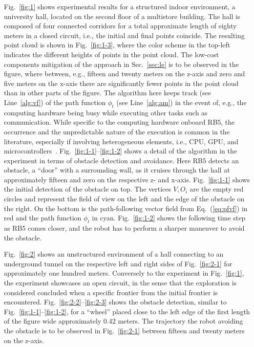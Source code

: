 \documentclass[lettersize,journal,twoside]{IEEEtran}
\theoremstyle{definition}
\begin{document}
Fig.~\ref{fig:1} shows experimental results for a structured indoor environment, a university hall, located on the second floor of a multistore building. The hall is composed of four connected corridors for a total approximate length of eighty meters in a closed circuit, i.e., the initial and final points coincide. The resulting point cloud is shown in Fig.~\ref{fig:1-3}, where the color scheme in the top-left indicates the different heights of points in the point cloud. The low-cost components mitigation of the %
approach in Sec.~\ref{sec:le} is to be observed in the figure, where between, e.g., fifteen and twenty meters on the z-axis and zero and five meters on the x-axis there are significantly fewer points in the point cloud than in other parts of the figure. The algorithm here keeps track (see Line~\ref{alg:vf}) of the path function $\phi_t$ (see Line~\ref{alg:am}) in the event of, e.g., the computing hardware being busy while executing other tasks such as communication. While specific to the computing hardware onboard RB5, the occurrence and the unpredictable nature of the execution is common in the literature, especially if involving heterogeneous elements, i.e., CPU, GPU, and microcontrollers~\cite{seewald2019coarse}.
%
Fig.~\ref{fig:1-1}--\ref{fig:1-2} shows a detail of the algorithm in the experiment in terms of obstacle detection and avoidance. Here RB5 detects an obstacle, a ``door'' with a surrounding wall, as it cruises through the hall at approximately fifteen and zero on the respective z- and x-axis. Fig.~\ref{fig:1-1} shows the initial detection of the obstacle on top. The vertices $V, O_i$ are the empty red circles and represent the field of view on the left and the edge of the obstacle on the right. On the bottom is the path-following vector field from Eq.~(\ref{eq:pfvf}) in red and the path function $\phi_t$ in cyan. Fig.~\ref{fig:1-2} shows the following time step as RB5 comes closer, and the robot has to perform a sharper maneuver to avoid the obstacle.

Fig.~\ref{fig:2} shows an unstructured environment of a hall connecting to an underground tunnel on the respective left and right sides of Fig.~\ref{fig:2-1} for approximately one hundred meters. Conversely to the experiment in Fig.~\ref{fig:1}, the experiment showcases an open circuit, in the sense that the exploration is considered concluded when a specific frontier from the initial frontier is encountered. Fig.~\ref{fig:2-2}--\ref{fig:2-3} shows the obstacle detection, similar to Fig.~\ref{fig:1-1}--\ref{fig:1-2}, for a ``wheel'' placed close to the left edge of the first length of the figure wide approximately 0.42 meters. The trajectory the robot avoiding the obstacle is to be observed in Fig.~\ref{fig:2-1} between fifteen and twenty meters on the z-axis.
\end{document}
